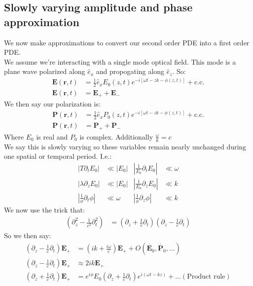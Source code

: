\subsection{Slowly varying amplitude and phase approximation}
We now make approximations to convert our second order PDE into a first order PDE.\\
We assume we're interacting with a single mode optical field. This mode is a plane wave polarized along $\hat{e}_x$ and propogating along $\hat{e}_z$. So:
\begin{align*}
	\bm{E}(\bm{r},t) &= \frac{1}{2}\hat{e}_xE_0(z,t)e^{-i[\omega t-zk-\phi(z,t)]} + \text{c.c.} \\
	\bm{E}(\bm{r},t) &= \bm{E}_+ + \bm{E}_-
\end{align*}
We then say our polarization is:
\begin{align*}
	\bm{P}(\bm{r},t) &= \frac{1}{2}\hat{e}_xP_0(z,t)e^{-i[\omega t-zk-\phi(z,t)]} + \text{c.c.} \\
	\bm{P}(\bm{r},t) &= \bm{P}_+ + \bm{P}_-
\end{align*}
Where $E_0$ is real and $P_0$ is complex. Additionally $\frac{\omega}{k} = c$ \\
We say this is slowly varying so these variables remain nearly unchanged during one spatial or temporal period. I.e.:
\begin{align*}
	|T\partial_t E_0 | &\ll |E_0| &
	|\frac{1}{E_0}\partial_t E_0 | &\ll \omega  \\
	|\lambda \partial_z E_0| &\ll |E_0| &
	|\frac{1}{E_0} \partial_z E_0| &\ll k \\
	|\frac{1}{\phi}\partial_t\phi | &\ll \omega &
	|\frac{1}{\phi}\partial_z\phi | &\ll k
\end{align*}
We now use the trick that:
\begin{align*}
	\left(\partial_z^2 - \frac{1}{c^2}\partial_t^2\right) &= \left(\partial_z + \frac{1}{c}\partial_t\right)\left(\partial_z - \frac{1}{c}\partial_t\right)
\end{align*}
So we then say:
\begin{align*}
	\left(\partial_z - \frac{1}{c}\partial_t\right)\bm{E}_+ &= \left(ik + \frac{i\omega}{c}\right)\bm{E}_+ + O(\dot{\bm{E}_0}, \dot{\bm{P}_0},\ldots) \\
	\left(\partial_z - \frac{1}{c}\partial_t\right)\bm{E}_+ &\approx 2ik\bm{E}_+ \\
	\left(\partial_z + \frac{1}{c}\partial_t\right)\bm{E}_+ &= e^{i\phi}E_0 \left(\partial_z + \frac{1}{c}\partial_t\right)e^{i(\omega t - kz)} + \ldots (\text{Product rule})
\end{align*}
